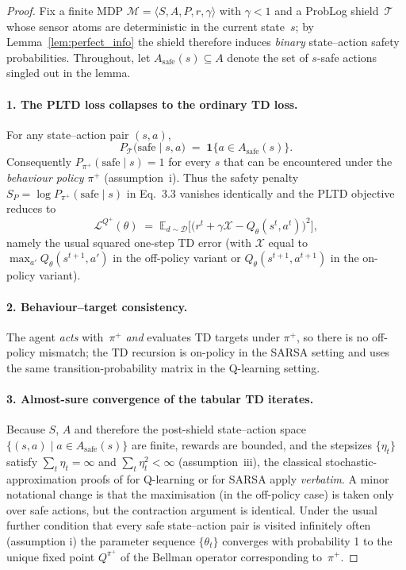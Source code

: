 \documentclass{ecai}
\theoremstyle{plain}
\theoremstyle{definition}
\theoremstyle{remark}
\begin{document}
\begin{proof}
Fix a finite MDP $\mathcal{M}=\langle S,A,P,r,\gamma\rangle$ with
$\gamma\!<\!1$ and a ProbLog shield~$\mathcal{T}$ whose sensor atoms are
deterministic in the current state~$s$; by
Lemma~\ref{lem:perfect_info} the shield therefore induces \emph{binary}
state–action safety probabilities.  Throughout, let
$A_{\text{safe}}(s)\subseteq A$ denote the set of $s$-safe actions singled out
in the lemma.

\paragraph{1.  The PLTD loss collapses to the ordinary TD loss.}
For any state–action pair $(s,a)$,
\begin{equation}
P_{\mathcal{T}}\bigl(\text{safe}\mid s,a\bigr)
  \;=\;\mathbf{1}\!\{a\in A_{\text{safe}}(s)\}.
\end{equation}
Consequently $P_{\pi^+}(\text{safe}\mid s)=1$ for every $s$ that can be
encountered under the \emph{behaviour policy} $\pi^+$ (assumption~i).
Thus the safety penalty
$S_P=\log P_{\pi^+}(\text{safe}\mid s)$ in
Eq.~3.3 vanishes identically and the PLTD objective reduces to
\begin{equation}
  \mathcal{L}^{Q^+}(\theta)
   \;=\;\mathbb{E}_{d\sim\mathcal D}\!\bigl[\!
     \bigl(r^t+\gamma\mathcal X-Q_\theta(s^t,a^t)\bigr)^2\bigr],
\end{equation}
namely the usual squared one-step TD error (with
$\mathcal X$ equal to $\max_{a'}Q_\theta(s^{t+1},a')$ in the off-policy
variant or $Q_\theta(s^{t+1},a^{t+1})$ in the on-policy variant).

\paragraph{2.  Behaviour–target consistency.}
The agent \emph{acts} with~$\pi^+$ \emph{and} evaluates TD targets under
$\pi^+$, so there is no off-policy mismatch; the TD recursion is
on-policy in the SARSA setting and uses the same transition-probability
matrix in the Q-learning setting.

\paragraph{3.  Almost-sure convergence of the tabular TD iterates.}
Because $S$, $A$ and therefore the post-shield state–action space
$
  \{(s,a)\mid a\in A_{\text{safe}}(s)\}
$
are finite, rewards are bounded, and the stepsizes
$\{\eta_t\}$ satisfy $\sum_t\eta_t=\infty$ and
$\sum_t\eta_t^{2}<\infty$ (assumption~iii), the classical stochastic-approximation proofs of \citet{watkins1992q} for Q-learning
or \citet{sutton2018reinforcement} for SARSA apply \emph{verbatim}.  A
minor notational change is that the maximisation (in the off-policy
case) is taken only over safe actions, but the contraction argument is
identical.  Under the usual further condition that every safe
state–action pair is visited infinitely often (assumption i) the parameter sequence
$\{\theta_t\}$ converges with probability 1 to the unique fixed point
$Q^{\pi^+}$ of the Bellman operator corresponding to~$\pi^+$.


\end{proof}
\end{document}
